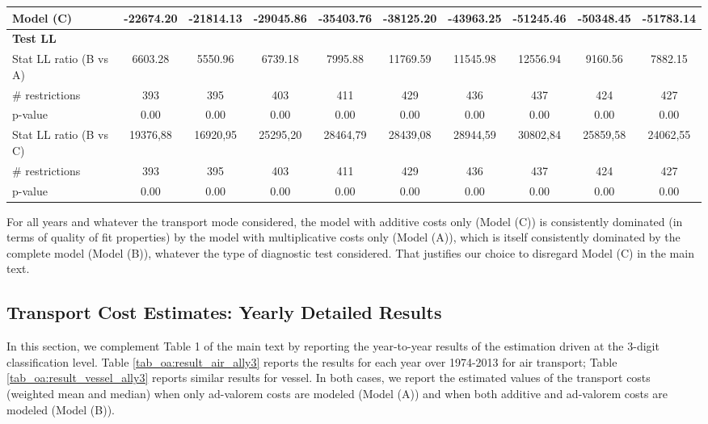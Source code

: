 \documentclass[11pt,twoside, authoryear]{elsarticle}
\begin{document}
\begin{landscape}
\begin{table}[htbp]
{\begin{tabular}{l|c c c c c c c c c}
    Model (C) & -22674.20 & -21814.13 & -29045.86 & -35403.76 & -38125.20 & -43963.25 & -51245.46 & -50348.45 & -51783.14 \\ \hline
   \multicolumn{10}{l}{ \textbf{Test LL} } \\ \hline
    Stat LL ratio (B vs A) & 6603.28 & 5550.96 & 6739.18 & 7995.88 & 11769.59 & 11545.98 & 12556.94 & 9160.56 & 7882.15 \\
    $\#$ restrictions & 393   & 395   & 403   & 411   & 429   & 436   & 437   & 424   & 427 \\
    p-value & 0.00  & 0.00  & 0.00  & 0.00  & 0.00  & 0.00  & 0.00  & 0.00  & 0.00 \\ \hline
    Stat LL ratio (B vs C) & 19376,88 & 16920,95 & 25295,20 & 28464,79 & 28439,08 & 28944,59 & 30802,84 & 25859,58 & 24062,55 \\
    $\#$ restrictions & 393   & 395   & 403   & 411   & 429   & 436   & 437   & 424   & 427 \\
    p-value & 0.00  & 0.00  & 0.00  & 0.00  & 0.00  & 0.00  & 0.00  & 0.00  & 0.00 \\
\hline \hline
    \end{tabular}%
}
\end{table}%
\end{landscape}

For all years and whatever the transport mode considered, the model with additive costs only (Model (C)) is consistently dominated (in terms of quality of fit properties) by the model with multiplicative costs only (Model (A)), which is itself consistently dominated by the complete model (Model (B)), whatever the type of diagnostic test considered. That justifies our choice to disregard Model (C) in the main text.

\newpage
\setcounter{table}{0}
\renewcommand{\thetable}{B.\arabic{table}}

\subsection{Transport Cost Estimates: Yearly Detailed Results}
In this section, we complement Table 1 of the main text by reporting the year-to-year results of the estimation driven at the 3-digit classification level. Table \ref{tab_oa:result_air_ally3} reports the results for each year over 1974-2013 for air transport; Table \ref{tab_oa:result_vessel_ally3} reports similar results for vessel. In both cases, we report the estimated values of the transport costs (weighted mean and median) when only ad-valorem costs are modeled (Model (A)) and when both additive and ad-valorem costs are modeled (Model (B)).
\end{document}
